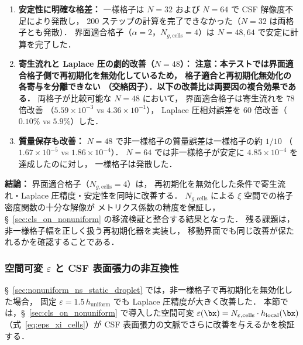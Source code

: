 \begin{enumerate}[noitemsep]
  \item \textbf{安定性に明確な格差：}
        一様格子は $N = 32$ および $N = 64$ で CSF 解像度不足により発散し，
        200 ステップの計算を完了できなかった（$N = 32$ は両格子とも発散）．
        界面適合格子（$\alpha = 2$，$N_{g,\text{cells}} = 4$）は
        $N = 48, 64$ で安定に計算を完了した．
  \item \textbf{寄生流れと Laplace 圧の劇的改善（$N = 48$）：}
        \textbf{注意：本テストでは界面適合格子側で再初期化を無効化しているため，
        格子適合と再初期化無効化の各寄与を分離できない
        （交絡因子）．以下の改善比は両要因の複合効果である．}
        両格子が比較可能な $N = 48$ において，
        界面適合格子は寄生流れを 78 倍改善
        （$5.59 \times 10^{-3}$ vs $4.36 \times 10^{-1}$），
        Laplace 圧相対誤差を 60 倍改善（$0.10\%$ vs $5.9\%$）した．
  \item \textbf{質量保存も改善：}
        $N = 48$ で非一様格子の質量誤差は一様格子の約 $1/10$
        （$1.67 \times 10^{-5}$ vs $1.86 \times 10^{-4}$）．
        $N = 64$ では非一様格子が安定に $4.85 \times 10^{-4}$ を達成したのに対し，
        一様格子は発散した．
\end{enumerate}

\noindent\textbf{結論：}
界面適合格子（$N_{g,\text{cells}} = 4$）は，
再初期化を無効化した条件で寄生流れ・Laplace 圧精度・安定性を同時に改善する．
$N_{g,\text{cells}}$ による $\xi$ 空間での格子密度関数の十分な解像が
メトリクス係数の精度を保証し，§~\ref{sec:cls_on_nonuniform} の移流検証と整合する結果となった．
残る課題は，非一様格子幅を正しく扱う再初期化器を実装し，
移動界面でも同じ改善が保たれるかを確認することである．


\subsubsection{\texorpdfstring{空間可変 $\varepsilon$ と CSF 表面張力の非互換性}{空間可変 epsilon と CSF 表面張力の非互換性}}
\label{sec:local_eps_validation}

§~\ref{sec:nonuniform_ns_static_droplet} では，非一様格子で再初期化を無効化した場合，
固定 $\varepsilon = 1.5\,h_{\mathrm{uniform}}$ でも Laplace 圧精度が大きく改善した．
本節では，§~\ref{sec:cls_on_nonuniform} で導入した空間可変
$\varepsilon(\bx) = N_{\varepsilon,\text{cells}} \cdot h_{\mathrm{local}}(\bx)$
（式~\eqref{eq:eps_xi_cells}）が CSF 表面張力の文脈でさらに改善を与えるかを検証する．

